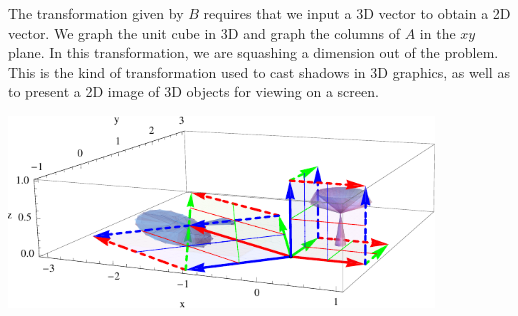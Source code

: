 \begin{example}
The transformation given by $B$ requires that we input a 3D vector to obtain a 2D vector.  We graph the unit cube in 3D and graph the columns of $A$ in the $xy$ plane. In this transformation, we are squashing a dimension out of the problem. This is the kind of transformation used to cast shadows in 3D graphics, as well as to present a 2D image of 3D objects for viewing on a screen. 
\begin{center}
\includegraphics[height=2in]{Linear-Transformations/support/LT3dto2d}
\end{center}


\end{example}


